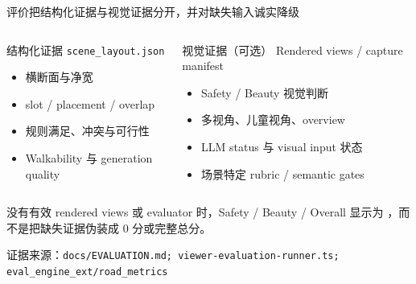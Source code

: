 \documentclass[aspectratio=169,10pt]{ctexbeamer}
\newcommand{\sourcefoot}[1]{\vfill{\scriptsize\color{hkustgrey}证据来源：\texttt{#1}}}
\newcommand{\artifact}[1]{\texttt{\color{hkustblue2}#1}}
\begin{document}
\begin{frame}{评价把结构化证据与视觉证据分开，并对缺失输入诚实降级}
  \begin{columns}[T,onlytextwidth]
      \begin{block}{结构化证据}
        \artifact{scene\_layout.json}
        \begin{itemize}
          \item 横断面与净宽
          \item slot / placement / overlap
          \item 规则满足、冲突与可行性
          \item Walkability 与 generation quality
        \end{itemize}
      \end{block}
      \begin{exampleblock}{视觉证据（可选）}
        Rendered views / capture manifest
        \begin{itemize}
          \item Safety / Beauty 视觉判断
          \item 多视角、儿童视角、overview
          \item LLM status 与 visual input 状态
          \item 场景特定 rubric / semantic gates
        \end{itemize}
      \end{exampleblock}
  \end{columns}
  \deckgap
  \begin{callout}[评价诚信规则]
    没有有效 rendered views 或 evaluator 时，Safety / Beauty / Overall 显示为 ，而不是把缺失证据伪装成 0 分或完整总分。
  \end{callout}
  \sourcefoot{docs/EVALUATION.md; viewer-evaluation-runner.ts; eval\_engine\_ext/road\_metrics}
\end{frame}
\end{document}
